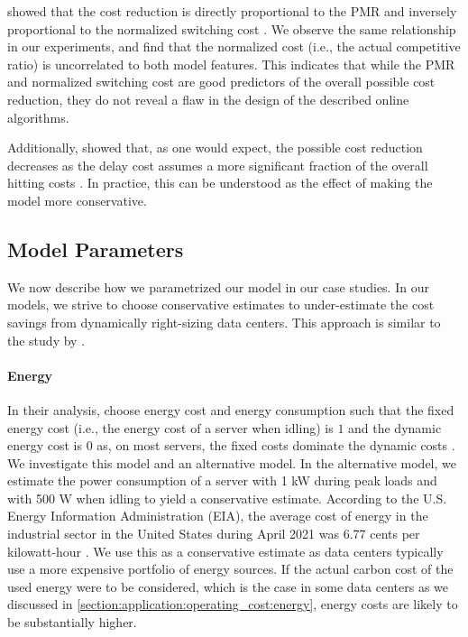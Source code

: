 \citeauthor*{Lin2011} showed that the cost reduction is directly proportional to the PMR and inversely proportional to the normalized switching cost \cite{Lin2011}. We observe the same relationship in our experiments, and find that the normalized cost (i.e., the actual competitive ratio) is uncorrelated to both model features. This indicates that while the PMR and normalized switching cost are good predictors of the overall possible cost reduction, they do not reveal a flaw in the design of the described online algorithms.

Additionally, \citeauthor*{Lin2011} showed that, as one would expect, the possible cost reduction decreases as the delay cost assumes a more significant fraction of the overall hitting costs \cite{Lin2011}. In practice, this can be understood as the effect of making the model more conservative.

\subsection{Model Parameters}

We now describe how we parametrized our model in our case studies. In our models, we strive to choose conservative estimates to under-estimate the cost savings from dynamically right-sizing data centers. This approach is similar to the study by \citeauthor*{Lin2011}.

\paragraph{Energy} In their analysis, \citeauthor*{Lin2011} choose energy cost and energy consumption such that the fixed energy cost (i.e., the energy cost of a server when idling) is $1$ and the dynamic energy cost is $0$ as, on most servers, the fixed costs dominate the dynamic costs \cite{Clark2005, Lin2011}. We investigate this model and an alternative model. In the alternative model, we estimate the power consumption of a server with 1 kW during peak loads and with 500 W when idling to yield a conservative estimate. According to the U.S. Energy Information Administration (EIA), the average cost of energy in the industrial sector in the United States during April 2021 was 6.77 cents per kilowatt-hour \cite{EIA2021}. We use this as a conservative estimate as data centers typically use a more expensive portfolio of energy sources. If the actual carbon cost of the used energy were to be considered, which is the case in some data centers as we discussed in \autoref{section:application:operating_cost:energy}, energy costs are likely to be substantially higher.

